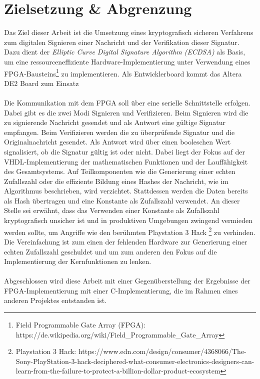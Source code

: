 
\chapter{Zielsetzung \& Abgrenzung} 
\label{sec:planung}
Das Ziel dieser Arbeit ist die Umsetzung eines kryptografisch sicheren Verfahrens zum digitalen Signieren einer Nachricht und der Verifikation dieser Signatur. Dazu dient der \textit{Elliptic Curve Digital Signature Algorithm (ECDSA)} als Basis, um eine ressourceneffiziente Hardware-Implementierung unter Verwendung eines FPGA-Bausteins\footnote{Field Programmable Gate Array (FPGA): https://de.wikipedia.org/wiki/Field\_Programmable\_Gate\_Array} zu implementieren. Als Entwicklerboard kommt das Altera DE2 Board zum Einsatz 
\\ \\
Die Kommunikation mit dem FPGA soll über eine serielle Schnittstelle erfolgen. Dabei gibt es die zwei Modi Signieren und Verifizieren. Beim Signieren wird die zu signierende Nachricht gesendet und als Antwort eine gültige Signatur empfangen. Beim Verifizieren werden die zu überprüfende Signatur und die Originalnachricht gesendet. Als Antwort wird über einen booleschen Wert signalisiert, ob die Signatur gültig ist oder nicht. Dabei liegt der Fokus auf der VHDL-Implementierung der mathematischen Funktionen und der Lauffähigkeit des Gesamtsystems. Auf Teilkomponenten wie die Generierung einer echten Zufallszahl oder die effiziente Bildung eines Hashes der Nachricht, wie im Algorithmus beschrieben, wird verzichtet. Stattdessen werden die Daten bereits als Hash übertragen und eine Konstante als Zufallszahl verwendet. An dieser Stelle sei erwähnt, dass das Verwenden einer Konstante als Zufallszahl kryptografisch unsicher ist und in produktiven Umgebungen zwingend vermieden werden sollte, um Angriffe wie den berühmten Playstation 3 Hack \footnote{Playstation 3 Hack: https://www.edn.com/design/consumer/4368066/The-Sony-PlayStation-3-hack-deciphered-what-consumer-electronics-designers-can-learn-from-the-failure-to-protect-a-billion-dollar-product-ecosystem} zu verhinden. Die Vereinfachung ist zum einen der fehlenden Hardware zur Generierung einer echten Zufallszahl geschuldet und um zum anderen den Fokus auf die Implementierung der Kernfunktionen zu lenken.  
\\ \\
Abgeschlossen wird diese Arbeit mit einer Gegenüberstellung der Ergebnisse der FPGA-Implementierung mit einer C-Implementierung, die im Rahmen eines anderen Projektes \cite{kewish} entstanden ist.


